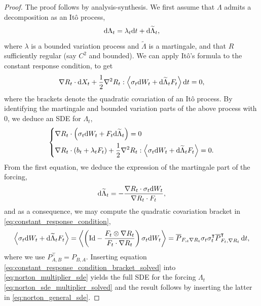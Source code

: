 \begin{proof}
The proof follows by analysis-synthesis.
We first assume that $\Lambda$ admits a decomposition as an Itô process,
\begin{equation}
    \label{eq:norton_multiplier_decomposition}
    \mathrm{d} \Lambda_t = \lambda_t \mathrm{d} t + \mathrm{d} \widetilde{\Lambda}_t,
\end{equation}
where $\lambda$ is a bounded variation process and $\widetilde{\Lambda}$ is a martingale, and that $R$ sufficiently regular (say $C^2$ and bounded).
We can apply Itô's formula to the constant response condition, to get
\begin{equation}
    \label{eq:constant_response_condition}
     \nabla R_t \cdot \mathrm{d} X_t + \frac12\nabla^2 R_t:\left\langle\sigma_t\mathrm{d} W_t + \mathrm{d}\widetilde{\Lambda}_tF_t\right\rangle\mathrm{d} t=0,
\end{equation}
where the brackets denote the quadratic covariation of an Itô process. By identifying the martingale and bounded variation parts of the above process with $0$, we deduce an SDE for $\Lambda_t$,
\begin{equation}
    \label{eq:norton_multiplier_sde}
    \left\{\begin{aligned}
        &\nabla R_t \cdot \left( \sigma_t\mathrm{d} W_t + F_t\mathrm{d} \widetilde{\Lambda}_t\right)=0\\
        &\nabla R_t \cdot \left( b_t + \lambda_t F_t\right)+\frac12\nabla^2 R_t: \left\langle\sigma_t\mathrm{d} W_t + \mathrm{d}\widetilde{\Lambda}_tF_t\right\rangle=0.
    \end{aligned}\right.
\end{equation}
From the first equation, we deduce the expression of the martingale part of the forcing,
\begin{equation}
    \label{eq:norton_multiplier_martingale}
    \mathrm{d} \widetilde{\Lambda}_t = - \frac{\nabla R_t\cdot \sigma_t\mathrm{d} W_t}{\nabla R_t\cdot F_t},
\end{equation}
and as a consequence, we may compute the quadratic covariation bracket in \eqref{eq:constant_response_condition},
\begin{equation}
    \label{eq:constant_response_condition_bracket_solved}
    \left\langle\sigma_t\mathrm{d} W_t + \mathrm{d}\widetilde{\Lambda}_tF_t\right\rangle=\left\langle\left(\mathrm{Id}-\frac{F_t\otimes \nabla R_t}{F_t\cdot \nabla R_t}\right)\sigma_t\mathrm{d} W_t\right\rangle = \overline{P}_{F,_t\nabla R_t}\sigma_t\sigma_t^\intercal\overline{P}^\intercal_{F_t,\nabla R_t}\,\mathrm{d} t,
\end{equation}
where we use $P^\intercal_{A,B}=P_{B,A}$. Inserting equation \eqref{eq:constant_response_condition_bracket_solved} into \eqref{eq:norton_multiplier_sde} yields the full SDE for the forcing $\Lambda_t$ \eqref{eq:norton_sde_multiplier_solved} and the result follows by inserting the latter in \eqref{eq:norton_general_sde}.
\end{proof}

